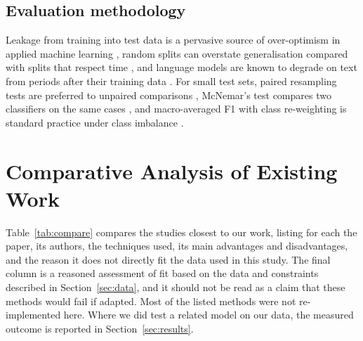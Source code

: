 \documentclass[11pt,a4paper]{article}
\begin{document}
\subsection{Evaluation methodology}
Leakage from training into test data is a pervasive source of over-optimism in applied machine learning \cite{r27}, random splits can overstate generalisation compared with splits that respect time \cite{r25}, and language models are known to degrade on text from periods after their training data \cite{r26}. For small test sets, paired resampling tests are preferred to unpaired comparisons \cite{r28,r34}, McNemar's test compares two classifiers on the same cases \cite{r35}, and macro-averaged F1 with class re-weighting is standard practice under class imbalance \cite{r60}.

\section{Comparative Analysis of Existing Work}\label{sec:compare}
Table~\ref{tab:compare} compares the studies closest to our work, listing for each the paper, its authors, the techniques used, its main advantages and disadvantages, and the reason it does not directly fit the data used in this study. The final column is a reasoned assessment of fit based on the data and constraints described in Section~\ref{sec:data}, and it should not be read as a claim that these methods would fail if adapted. Most of the listed methods were not re-implemented here. Where we did test a related model on our data, the measured outcome is reported in Section~\ref{sec:results}.
\end{document}
